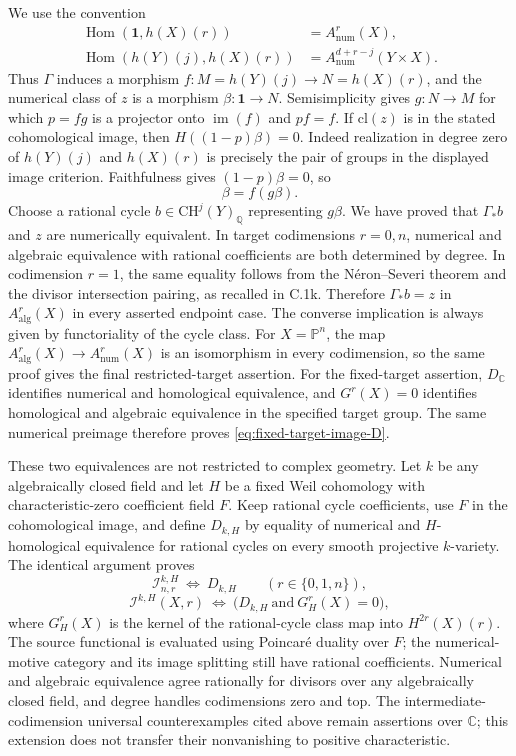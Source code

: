 We use the convention
\[
 \begin{split}
 \operatorname{Hom}(\mathbf1,h(X)(r))
       &=A^r_{\mathrm{num}}(X),\\
 \operatorname{Hom}(h(Y)(j),h(X)(r))
       &=A^{d+r-j}_{\mathrm{num}}(Y\times X).
 \end{split}
\]
Thus $\Gamma$ induces a morphism
$f:M=h(Y)(j)\to N=h(X)(r)$, and the numerical class of
$z$ is a morphism $\beta:\mathbf1\to N$. Semisimplicity
gives $g:N\to M$ for which $p=fg$ is a projector onto
$\operatorname{im}(f)$ and $pf=f$. If $\mathrm{cl}(z)$ is
in the stated cohomological image, then
$H((1-p)\beta)=0$. Indeed realization in degree zero of
$h(Y)(j)$ and $h(X)(r)$ is precisely the pair of groups in
the displayed image criterion. Faithfulness gives
$(1-p)\beta=0$, so
\[
                     \beta=f(g\beta).
\]
Choose a rational cycle $b\in\mathrm{CH}^j(Y)_{\mathbb Q}$
representing $g\beta$. We have proved that $\Gamma_*b$ and
$z$ are numerically equivalent. In target codimensions
$r=0,n$, numerical and algebraic equivalence with rational
coefficients are both determined by degree. In codimension
$r=1$, the same equality follows from the N\'eron--Severi
theorem and the divisor intersection pairing, as recalled
in C.1k. Therefore $\Gamma_*b=z$ in
$A^r_{\mathrm{alg}}(X)$ in every asserted endpoint case.
The converse implication is always given by functoriality
of the cycle class. For $X=\mathbb P^n$, the map
$A^r_{\mathrm{alg}}(X)\to A^r_{\mathrm{num}}(X)$ is an
isomorphism in every codimension, so the same proof gives
the final restricted-target assertion.
For the fixed-target assertion, $D_{\mathbb C}$ identifies
numerical and homological equivalence, and $G^r(X)=0$
identifies homological and algebraic equivalence in the
specified target group. The same numerical preimage therefore
proves \eqref{eq:fixed-target-image-D}.

These two equivalences are not restricted to complex geometry.
Let $k$ be any algebraically closed field and let $H$ be a
fixed Weil cohomology with characteristic-zero coefficient
field $F$. Keep rational cycle coefficients, use $F$ in the
cohomological image, and define $D_{k,H}$ by equality of
numerical and $H$-homological equivalence for rational cycles
on every smooth projective $k$-variety. The identical argument
proves
\[
 \mathcal I_{n,r}^{k,H}\ \Longleftrightarrow\ D_{k,H}
         \qquad(r\in\{0,1,n\}),
\]
\[
 \mathcal I^{k,H}(X,r)\ \Longleftrightarrow\
       \bigl(D_{k,H}\ \text{and}\ G_H^r(X)=0\bigr),
\]
where $G_H^r(X)$ is the kernel of the rational-cycle class map
into $H^{2r}(X)(r)$. The source functional is evaluated using
Poincar\'e duality over $F$; the numerical-motive category
and its image splitting still have rational coefficients.
Numerical and algebraic equivalence agree rationally for
divisors over any algebraically closed field, and degree
handles codimensions zero and top. The intermediate-codimension
universal counterexamples cited above remain assertions over
$\mathbb C$; this extension does not transfer their
nonvanishing to positive characteristic.

